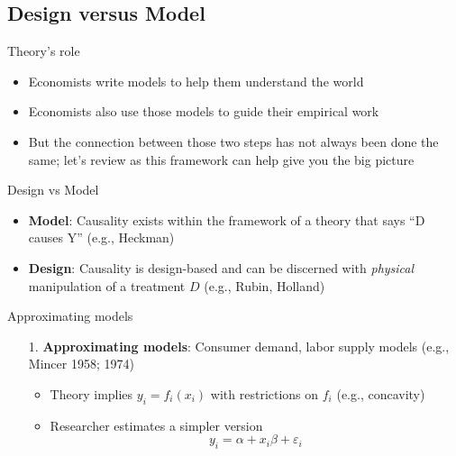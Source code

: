 \documentclass{beamer}
\begin{document}
\subsection{Design versus Model}

\begin{frame}{Theory's role}

\begin{itemize}
\item Economists write models to help them understand the world
\item Economists also use those models to guide their empirical work
\item But the connection between those two steps has not always been done the same; let's review as this framework can help give you the big picture
\end{itemize}

\end{frame}


\begin{frame}{Design vs Model}

  \begin{itemize}
    \item \textbf{Model}: Causality exists within the framework of a theory that says ``D causes Y'' (e.g., Heckman)
    \item \textbf{Design}: Causality is design-based and can be discerned with \emph{physical} manipulation of a treatment $D$ (e.g., Rubin, Holland)
  \end{itemize}
\end{frame}


\begin{frame}{Approximating models}

  \begin{enumerate}
    \item[1. ] \textbf{Approximating models}: Consumer demand, labor supply models (e.g., Mincer 1958; 1974)
          \begin{itemize}
            \item Theory implies $y_i=f_i(x_i)$ with restrictions on $f_i$ (e.g., concavity)
            \item Researcher estimates a simpler version $$y_i = \alpha + x_i \beta + \varepsilon_i$$
          \end{itemize}
  \end{enumerate}

\end{frame}
\end{document}
